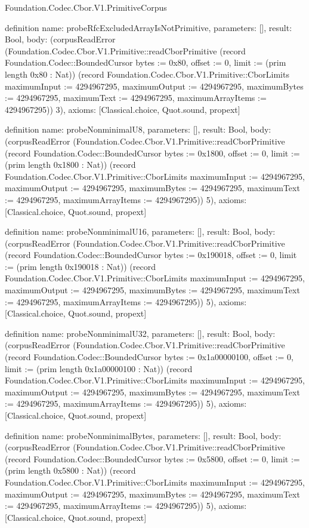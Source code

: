 \begin{lexlean}{Foundation.Codec.Cbor.V1.PrimitiveCorpus}
\begin{semanticmodule}
definition{
  name: probeRfcExcludedArrayIsNotPrimitive,
  parameters: [],
  result: Bool,
  body: (corpusReadError (Foundation.Codec.Cbor.V1.Primitive::readCborPrimitive (record Foundation.Codec::BoundedCursor {bytes := 0x80, offset := 0, limit := (prim length 0x80 : Nat)}) (record Foundation.Codec.Cbor.V1.Primitive::CborLimits {maximumInput := 4294967295, maximumOutput := 4294967295, maximumBytes := 4294967295, maximumText := 4294967295, maximumArrayItems := 4294967295})) 3),
  axioms: [Classical.choice, Quot.sound, propext]
}

definition{
  name: probeNonminimalU8,
  parameters: [],
  result: Bool,
  body: (corpusReadError (Foundation.Codec.Cbor.V1.Primitive::readCborPrimitive (record Foundation.Codec::BoundedCursor {bytes := 0x1800, offset := 0, limit := (prim length 0x1800 : Nat)}) (record Foundation.Codec.Cbor.V1.Primitive::CborLimits {maximumInput := 4294967295, maximumOutput := 4294967295, maximumBytes := 4294967295, maximumText := 4294967295, maximumArrayItems := 4294967295})) 5),
  axioms: [Classical.choice, Quot.sound, propext]
}

definition{
  name: probeNonminimalU16,
  parameters: [],
  result: Bool,
  body: (corpusReadError (Foundation.Codec.Cbor.V1.Primitive::readCborPrimitive (record Foundation.Codec::BoundedCursor {bytes := 0x190018, offset := 0, limit := (prim length 0x190018 : Nat)}) (record Foundation.Codec.Cbor.V1.Primitive::CborLimits {maximumInput := 4294967295, maximumOutput := 4294967295, maximumBytes := 4294967295, maximumText := 4294967295, maximumArrayItems := 4294967295})) 5),
  axioms: [Classical.choice, Quot.sound, propext]
}

definition{
  name: probeNonminimalU32,
  parameters: [],
  result: Bool,
  body: (corpusReadError (Foundation.Codec.Cbor.V1.Primitive::readCborPrimitive (record Foundation.Codec::BoundedCursor {bytes := 0x1a00000100, offset := 0, limit := (prim length 0x1a00000100 : Nat)}) (record Foundation.Codec.Cbor.V1.Primitive::CborLimits {maximumInput := 4294967295, maximumOutput := 4294967295, maximumBytes := 4294967295, maximumText := 4294967295, maximumArrayItems := 4294967295})) 5),
  axioms: [Classical.choice, Quot.sound, propext]
}

definition{
  name: probeNonminimalBytes,
  parameters: [],
  result: Bool,
  body: (corpusReadError (Foundation.Codec.Cbor.V1.Primitive::readCborPrimitive (record Foundation.Codec::BoundedCursor {bytes := 0x5800, offset := 0, limit := (prim length 0x5800 : Nat)}) (record Foundation.Codec.Cbor.V1.Primitive::CborLimits {maximumInput := 4294967295, maximumOutput := 4294967295, maximumBytes := 4294967295, maximumText := 4294967295, maximumArrayItems := 4294967295})) 5),
  axioms: [Classical.choice, Quot.sound, propext]
}


\end{semanticmodule}
\end{lexlean}
